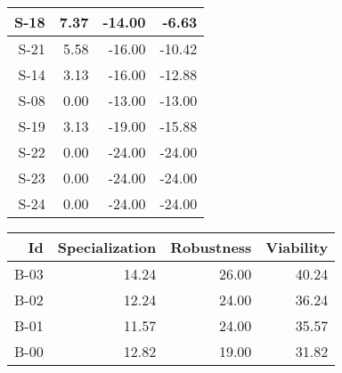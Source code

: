 \begin{tabular}{ | r | r | r | r | }
    \hline
                  S-18  &            7.37  &          -14.00  &           -6.63  \\
    \hline
                  S-21  &            5.58  &          -16.00  &          -10.42  \\
    \hline
                  S-14  &            3.13  &          -16.00  &          -12.88  \\
    \hline
                  S-08  &            0.00  &          -13.00  &          -13.00  \\
    \hline
                  S-19  &            3.13  &          -19.00  &          -15.88  \\
    \hline
                  S-22  &            0.00  &          -24.00  &          -24.00  \\
    \hline
                  S-23  &            0.00  &          -24.00  &          -24.00  \\
    \hline
                  S-24  &            0.00  &          -24.00  &          -24.00  \\
    \hline
\end{tabular}


\begin{tabular}{ | r | r | r | r | }
    \hline
                    Id  &  Specialization  &      Robustness  &       Viability  \\
    \hline
    \hline
                  B-03  &           14.24  &           26.00  &           40.24  \\
    \hline
                  B-02  &           12.24  &           24.00  &           36.24  \\
    \hline
                  B-01  &           11.57  &           24.00  &           35.57  \\
    \hline
                  B-00  &           12.82  &           19.00  &           31.82  \\
    \hline
\end{tabular}


